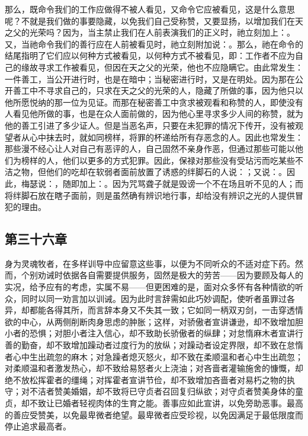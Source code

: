 那么，既命令我们的工作应做得不被人看见，又命令它应被看见，这是什么意思呢？不就是我们做的事要隐藏，以免我们自己受称赞，又要显扬，以增加我们在天之父的光荣吗？因为，当主禁止我们在人前表演我们的正义时，祂立刻加上：。又，当祂命令我们的善行应在人前被看见时，祂立刻附加说：。那么，祂在命令的结尾指明了它们应以何种方式被看见，以何种方式不被看见，即：工作者不应为自己的缘故寻求工作被看见，但因在天之父的光荣，他也不应隐瞒它。由此常发生：一件善工，当公开进行时，也是在暗中；当秘密进行时，又是在明处。因为那在公开善工中不寻求自己的，只求在天之父的光荣的人，隐藏了所做的事，因为他只以他所愿悦纳的那一位为见证。而那在秘密善工中贪求被观看和称赞的人，即使没有人看见他所做的事，也是在众人面前做的，因为他心里寻求多少人间的称赞，就为他的善工引进了多少证人。但是当恶名声，只要在未犯罪的情况下传开，没有被观望者从心中抹去时，就如同榜样，将罪的杯递给所有存恶念的人。因此也常发生：那些漫不经心让人对自己有恶评的人，自己固然不亲身作恶，但通过那些可能以他们为榜样的人，他们以更多的方式犯罪。因此，保禄对那些没有受玷污而吃某些不洁之物，但他们的吃却在软弱者面前放置了诱惑的绊脚石的人说：；又说：。因此，梅瑟说：，随即加上：。因为咒骂聋子就是毁谤一个不在场且听不见的人；而将绊脚石放在瞎子面前，则是虽然确有辨识地行事，却给没有辨识之光的人提供冒犯的理由。\par


\subsection{第三十六章}

\par

身为灵魂牧者，在多样训导中应留意这些事，以便为不同听众的不适对症下药。然而，个别劝诫时依据各自需要提供服务，固然是极大的劳苦——因为要顾及每人的实况，给予应有的考虑，实属不易——但更困难的是，面对众多怀有各种情欲的听众，同时以同一劝言加以训诫。因为此时言辞需如此巧妙调配，使听者虽罪过各异，却都能各得其所，而言辞本身又不失其一致；它如同一柄双刃剑，一击穿透情欲的中心，从两侧削断肉身思虑的肿胀；这样，对骄傲者宣讲谦逊，却不致增加胆小者的恐惧；对胆小者注入信心，却不致助长骄傲者的纵肆；对怠惰麻木者宣讲行善的勤奋，却不致增加躁动者过度行为的放纵；对躁动者设定界限，却不致在怠惰者心中生出疏忽的麻木；对急躁者熄灭怒火，却不致在柔顺温和者心中生出疏忽；对柔顺温和者激发热心，却不致给易怒者火上浇油；对吝啬者灌输施舍的慷慨，却绝不放松挥霍者的缰绳；对挥霍者宣讲节俭，却不致增加吝啬者对易朽之物的执守；对不洁者赞美婚姻，却不致将已守贞者召回复归纵欲；对守贞者赞美身体的童贞，却不致让已婚者轻视肉体的生育之能。善事应如此宣讲，以免旁助恶事。最高的善应受赞美，以免最卑微者绝望。最卑微者应受珍视，以免因满足于最低限度而停止追求最高者。\par

